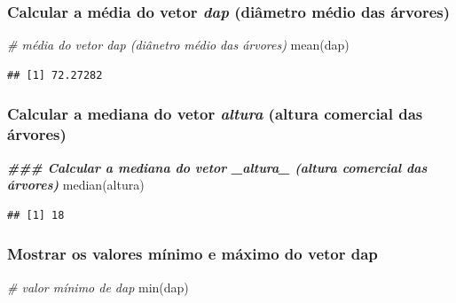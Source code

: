\documentclass[
]{article}
\newenvironment{Shaded}{\begin{snugshade}}{\end{snugshade}}
\newcommand{\CommentTok}[1]{\textcolor[rgb]{0.56,0.35,0.01}{\textit{#1}}}
\newcommand{\DocumentationTok}[1]{\textcolor[rgb]{0.56,0.35,0.01}{\textbf{\textit{#1}}}}
\newcommand{\FunctionTok}[1]{\textcolor[rgb]{0.00,0.00,0.00}{#1}}
\newcommand{\NormalTok}[1]{#1}
\begin{document}
\hypertarget{calcular-a-muxe9dia-do-vetor-dap-diuxe2metro-muxe9dio-das-uxe1rvores}{%
\subsubsection{\texorpdfstring{Calcular a média do vetor \emph{dap}
(diâmetro médio das
árvores)}{Calcular a média do vetor dap (diâmetro médio das árvores)}}\label{calcular-a-muxe9dia-do-vetor-dap-diuxe2metro-muxe9dio-das-uxe1rvores}}

\begin{Shaded}
\begin{Highlighting}[]
\CommentTok{\# média do vetor dap (diânetro médio das árvores)}
\FunctionTok{mean}\NormalTok{(dap)}
\end{Highlighting}
\end{Shaded}

\begin{verbatim}
## [1] 72.27282
\end{verbatim}

\hypertarget{calcular-a-mediana-do-vetor-altura-altura-comercial-das-uxe1rvores}{%
\subsubsection{\texorpdfstring{Calcular a mediana do vetor \emph{altura}
(altura comercial das
árvores)}{Calcular a mediana do vetor altura (altura comercial das árvores)}}\label{calcular-a-mediana-do-vetor-altura-altura-comercial-das-uxe1rvores}}

\begin{Shaded}
\begin{Highlighting}[]
\DocumentationTok{\#\#\# Calcular a mediana do vetor \_altura\_ (altura comercial das árvores)}
\FunctionTok{median}\NormalTok{(altura)}
\end{Highlighting}
\end{Shaded}

\begin{verbatim}
## [1] 18
\end{verbatim}

\hypertarget{mostrar-os-valores-muxednimo-e-muxe1ximo-do-vetor-dap}{%
\subsubsection{Mostrar os valores mínimo e máximo do vetor
dap}\label{mostrar-os-valores-muxednimo-e-muxe1ximo-do-vetor-dap}}

\begin{Shaded}
\begin{Highlighting}[]
\CommentTok{\# valor mínimo de dap}
\FunctionTok{min}\NormalTok{(dap)}
\end{Highlighting}
\end{Shaded}
\end{document}
